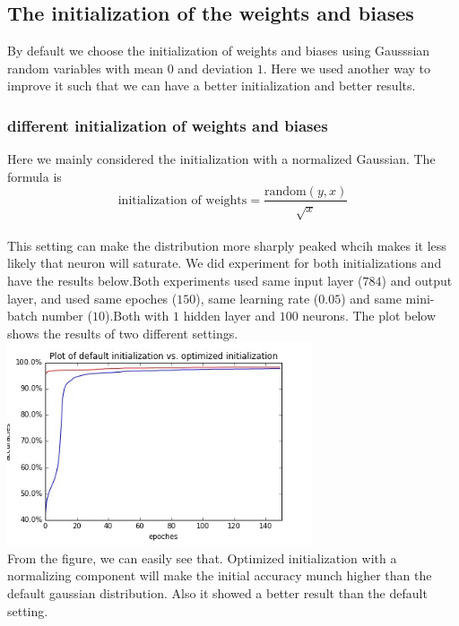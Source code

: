 \documentclass[12pt,a4paper]{article}
\begin{document}
\subsection{The initialization of the weights and biases}
By default we choose the initialization of weights and biases using Gausssian random variables with mean $0$ and deviation $1$. Here we used another way to improve it such that we can have a better initialization and better results.
\subsubsection{different initialization of weights and biases}
Here we mainly considered the initialization with a normalized Gaussian. The formula is\\
\[\text{initialization of weights}= \frac{\text{random} (y, x)}{\sqrt{x}}\]\\
This setting can make the distribution more sharply peaked whcih makes it less likely that neuron will saturate. We did experiment for both initializations and have the results below.Both experiments used same input layer ($784$) and output layer, and used same epoches ($150$), same learning rate ($0.05$) and same mini-batch number ($10$).Both with $1$ hidden layer and $100$ neurons. The plot below shows the results of two different settings.\\
\includegraphics[width=90mm,scale=1]{p201.jpg}\\
From the figure, we can easily see that. Optimized initialization with a normalizing component will make the initial accuracy munch higher than the default gaussian distribution. Also it showed a better result than the default setting.
\end{document}

